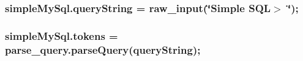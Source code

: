 \subsubsection[{\texorpdfstring{query\+String}{queryString}}]{\setlength{\rightskip}{0pt plus 5cm}simple\+My\+Sql.\+query\+String = raw\+\_\+input(\char`\"{}Simple S\+QL$>$ \char`\"{});}\hypertarget{namespacesimpleMySql_af513a74733fc4618dc6e1cea0390040f}{}\label{namespacesimpleMySql_af513a74733fc4618dc6e1cea0390040f}
\subsubsection[{\texorpdfstring{tokens}{tokens}}]{\setlength{\rightskip}{0pt plus 5cm}simple\+My\+Sql.\+tokens = {\bf parse\+\_\+query.\+parse\+Query}({\bf query\+String});}\hypertarget{namespacesimpleMySql_a4651e13ede722e6e54b901779260595a}{}\label{namespacesimpleMySql_a4651e13ede722e6e54b901779260595a}
